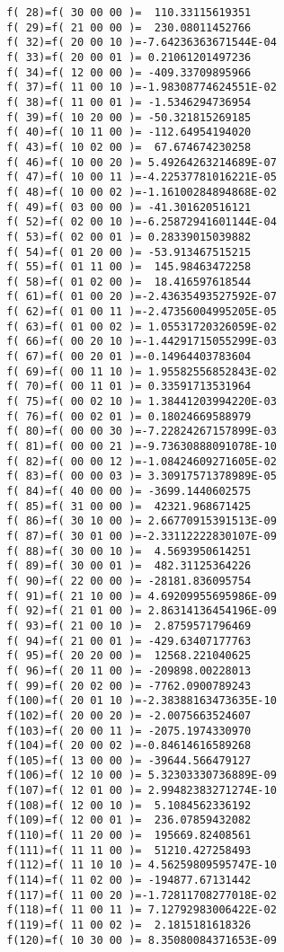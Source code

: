 \begin{footnotesize}
\begin{verbatim}
 f( 28)=f( 30 00 00 )=  110.33115619351
 f( 29)=f( 21 00 00 )=  230.08011452766
 f( 32)=f( 20 00 10 )=-7.64236363671544E-04
 f( 33)=f( 20 00 01 )= 0.21061201497236
 f( 34)=f( 12 00 00 )= -409.33709895966
 f( 37)=f( 11 00 10 )=-1.98308774624551E-02
 f( 38)=f( 11 00 01 )= -1.5346294736954
 f( 39)=f( 10 20 00 )= -50.321815269185
 f( 40)=f( 10 11 00 )= -112.64954194020
 f( 43)=f( 10 02 00 )=  67.674674230258
 f( 46)=f( 10 00 20 )= 5.49264263214689E-07
 f( 47)=f( 10 00 11 )=-4.22537781016221E-05
 f( 48)=f( 10 00 02 )=-1.16100284894868E-02
 f( 49)=f( 03 00 00 )= -41.301620516121
 f( 52)=f( 02 00 10 )=-6.25872941601144E-04
 f( 53)=f( 02 00 01 )= 0.28339015039882
 f( 54)=f( 01 20 00 )= -53.913467515215
 f( 55)=f( 01 11 00 )=  145.98463472258
 f( 58)=f( 01 02 00 )=  18.416597618544
 f( 61)=f( 01 00 20 )=-2.43635493527592E-07
 f( 62)=f( 01 00 11 )=-2.47356004995205E-05
 f( 63)=f( 01 00 02 )= 1.05531720326059E-02
 f( 66)=f( 00 20 10 )=-1.44291715055299E-03
 f( 67)=f( 00 20 01 )=-0.14964403783604
 f( 69)=f( 00 11 10 )= 1.95582556852843E-02
 f( 70)=f( 00 11 01 )= 0.33591713531964
 f( 75)=f( 00 02 10 )= 1.38441203994220E-03
 f( 76)=f( 00 02 01 )= 0.18024669588979
 f( 80)=f( 00 00 30 )=-7.22824267157899E-03
 f( 81)=f( 00 00 21 )=-9.73630888091078E-10
 f( 82)=f( 00 00 12 )=-1.08424609271605E-02
 f( 83)=f( 00 00 03 )= 3.30917571378989E-05
 f( 84)=f( 40 00 00 )= -3699.1440602575
 f( 85)=f( 31 00 00 )=  42321.968671425
 f( 86)=f( 30 10 00 )= 2.66770915391513E-09
 f( 87)=f( 30 01 00 )=-2.33112222830107E-09
 f( 88)=f( 30 00 10 )=  4.5693950614251
 f( 89)=f( 30 00 01 )=  482.31125364226
 f( 90)=f( 22 00 00 )= -28181.836095754
 f( 91)=f( 21 10 00 )= 4.69209955695986E-09
 f( 92)=f( 21 01 00 )= 2.86314136454196E-09
 f( 93)=f( 21 00 10 )=  2.8759571796469
 f( 94)=f( 21 00 01 )= -429.63407177763
 f( 95)=f( 20 20 00 )=  12568.221040625
 f( 96)=f( 20 11 00 )= -209898.00228013
 f( 99)=f( 20 02 00 )= -7762.0900789243
 f(100)=f( 20 01 10 )=-2.38388163473635E-10
 f(102)=f( 20 00 20 )= -2.0075663524607
 f(103)=f( 20 00 11 )= -2075.1974330970
 f(104)=f( 20 00 02 )=-0.84614616589268
 f(105)=f( 13 00 00 )= -39644.566479127
 f(106)=f( 12 10 00 )= 5.32303330736889E-09
 f(107)=f( 12 01 00 )= 2.99482383271274E-10
 f(108)=f( 12 00 10 )=  5.1084562336192
 f(109)=f( 12 00 01 )=  236.07859432082
 f(110)=f( 11 20 00 )=  195669.82408561
 f(111)=f( 11 11 00 )=  51210.427258493
 f(112)=f( 11 10 10 )= 4.56259809595747E-10
 f(114)=f( 11 02 00 )= -194877.67131442
 f(117)=f( 11 00 20 )=-1.72811708277018E-02
 f(118)=f( 11 00 11 )= 7.12792983006422E-02
 f(119)=f( 11 00 02 )=  2.1815181618326
 f(120)=f( 10 30 00 )= 8.35080084371653E-09

\end{verbatim}
\end{footnotesize}
